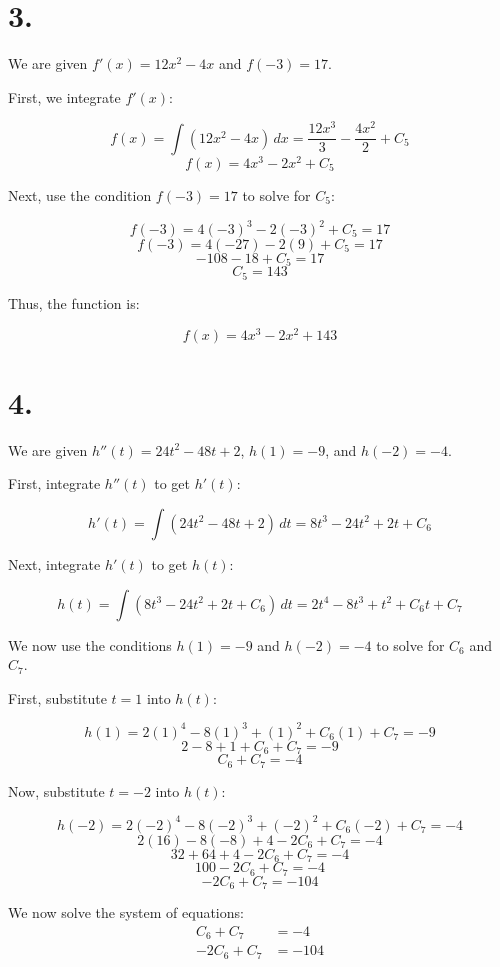 \documentclass{article}
\begin{document}
\section*{3.}

We are given \( f'(x) = 12x^2 - 4x \) and \( f(-3) = 17 \).

First, we integrate \( f'(x) \):

\[
f(x) = \int (12x^2 - 4x) \, dx = \frac{12x^3}{3} - \frac{4x^2}{2} + C_5
\]
\[
f(x) = 4x^3 - 2x^2 + C_5
\]

Next, use the condition \( f(-3) = 17 \) to solve for \( C_5 \):

\[
f(-3) = 4(-3)^3 - 2(-3)^2 + C_5 = 17
\]
\[
f(-3) = 4(-27) - 2(9) + C_5 = 17
\]
\[
-108 - 18 + C_5 = 17
\]
\[
C_5 = 143
\]

Thus, the function is:

\[
f(x) = 4x^3 - 2x^2 + 143
\]

\section*{4.}

We are given \( h''(t) = 24t^2 - 48t + 2 \), \( h(1) = -9 \), and \( h(-2) = -4 \).

First, integrate \( h''(t) \) to get \( h'(t) \):

\[
h'(t) = \int (24t^2 - 48t + 2) \, dt = 8t^3 - 24t^2 + 2t + C_6
\]

Next, integrate \( h'(t) \) to get \( h(t) \):

\[
h(t) = \int (8t^3 - 24t^2 + 2t + C_6) \, dt = 2t^4 - 8t^3 + t^2 + C_6t + C_7
\]

We now use the conditions \( h(1) = -9 \) and \( h(-2) = -4 \) to solve for \( C_6 \) and \( C_7 \).

First, substitute \( t = 1 \) into \( h(t) \):

\[
h(1) = 2(1)^4 - 8(1)^3 + (1)^2 + C_6(1) + C_7 = -9
\]
\[
2 - 8 + 1 + C_6 + C_7 = -9
\]
\[
C_6 + C_7 = -4
\]

Now, substitute \( t = -2 \) into \( h(t) \):

\[
h(-2) = 2(-2)^4 - 8(-2)^3 + (-2)^2 + C_6(-2) + C_7 = -4
\]
\[
2(16) - 8(-8) + 4 - 2C_6 + C_7 = -4
\]
\[
32 + 64 + 4 - 2C_6 + C_7 = -4
\]
\[
100 - 2C_6 + C_7 = -4
\]
\[
-2C_6 + C_7 = -104
\]

We now solve the system of equations:
\[
\begin{aligned}
C_6 + C_7 &= -4 \\
-2C_6 + C_7 &= -104
\end{aligned}
\]
\end{document}
